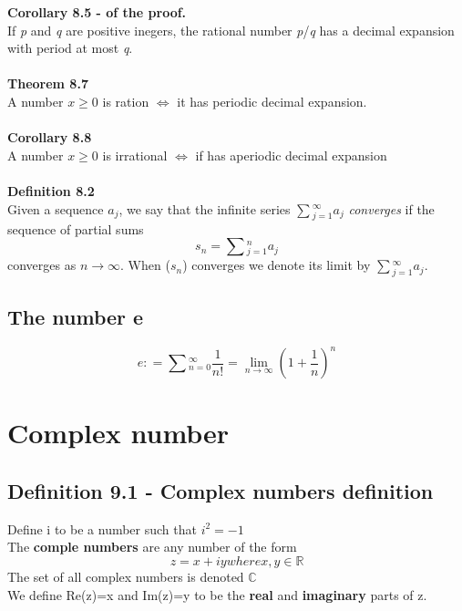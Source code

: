 \documentclass{article}
\theoremstyle{definition}
\theoremstyle{definition}
\theoremstyle{remark}
\begin{document}
\textbf{Corollary 8.5 - of the proof.}\\
If \textit{p} and \textit{q} are positive inegers, the rational number \textit{p}/\textit{q}
has a decimal expansion with period at most \textit{q}.\\
\\
\textbf{Theorem 8.7}\\
A number $x \geq 0$ is ration $\Leftrightarrow$ it has periodic decimal expansion. \\
\\
\textbf{Corollary 8.8}\\
A number $x \geq 0$ is irrational $\Leftrightarrow$ if has aperiodic decimal expansion\\
\\
\textbf{Definition 8.2}\\
Given a sequence ${{a}_{j}}$, we say that the infinite series ${\sum{^{\infty}_{j=1}}{a}_{j}}$ \emph{converges} if 
the sequence of partial sums \\
\begin{equation}
    {s}_{n}={\sum{^{n}_{j=1}}{a}_{j}}
\end{equation}
converges as $n \rightarrow \infty$. When (${s}_{n}$) converges we denote its limit by ${\sum{^{\infty}_{j=1}}{a}_{j}}$.\\

\subsection{The number e}
\begin{equation}
    e: = {\sum{^{\infty}_{n=0}}\frac{1}{n!}} = \lim_{n \rightarrow \infty}(1+\frac{1}{n})^{n}
\end{equation}

\newpage

\section{Complex number}
\subsection{Definition 9.1 - Complex numbers definition}
Define i to be a number such that $i^2 = -1$ \\
The \textbf{comple numbers} are any number of the form 
\begin{equation}
    z=x+iy where x,y \in \mathbb{R}
\end{equation}
The set of all complex numbers is denoted $\mathbb{C}$\\
We define Re(z)=x and Im(z)=y to be the \textbf{real} and \textbf{imaginary} parts of z.\\
\end{document}
